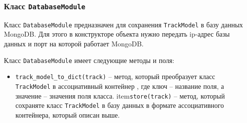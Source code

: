 \subsubsection{Класс \texttt{DatabaseModule}}

Класс \texttt{DatabaseModule} предназначен для сохранения \texttt{TrackModel} в базу данных MongoDB. Для этого в конструкторе объекта нужно передать ip-адрес базы данных и порт на которой работает MongoDB.

Класс \texttt{DatabaseModule} имеет следующие методы и поля:

\begin{itemize}
\item{\texttt{track\_model\_to\_dict(track)} -- метод, который преобразует класс \texttt{TrackModel} в ассоциативный контейнер , где ключ -- название поля, а значение -- значения поля класса.}
item{\texttt{store(track)} -- метод, который сохраняте класс \texttt{TrackModel} в базу данных в формате ассоциативного контейнера, который описан выше.}
\end{itemize}





